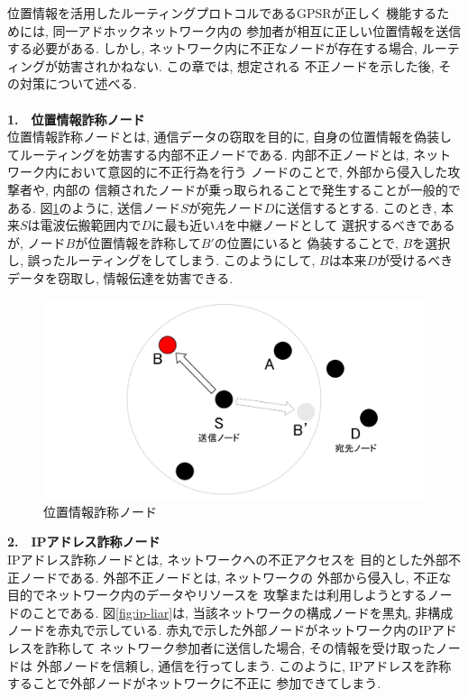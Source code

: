 位置情報を活用したルーティングプロトコルであるGPSRが正しく
機能するためには, 同一アドホックネットワーク内の
参加者が相互に正しい位置情報を送信する必要がある. 
しかし, ネットワーク内に不正なノードが存在する場合, 
ルーティングが妨害されかねない. この章では, 想定される 
不正ノードを示した後, その対策について述べる. \\

\\[0.5em]
\noindent \textbf{1.　位置情報詐称ノード}\\
\indent 位置情報詐称ノードとは, 通信データの窃取を目的に, 
自身の位置情報を偽装してルーティングを妨害する内部不正ノードである. 
内部不正ノードとは, ネットワーク内において意図的に不正行為を行う
ノードのことで, 外部から侵入した攻撃者や, 内部の
信頼されたノードが乗っ取られることで発生することが一般的である. 
図\ref{fig:position-liar}のように, 送信ノード$S$が宛先ノード$D$に送信するとする. 
このとき, 本来$S$は電波伝搬範囲内で$D$に最も近い$A$を中継ノードとして
選択するべきであるが, ノード$B$が位置情報を詐称して$B'$の位置にいると
偽装することで, $B$を選択し, 誤ったルーティングをしてしまう. 
このようにして, $B$は本来$D$が受けるべきデータを窃取し, 
情報伝達を妨害できる.

\begin{figure}
  \centering
  \includegraphics[scale=0.7]{figures/position-liar.png}
  \caption{位置情報詐称ノード}
  \label{fig:position-liar}
\end{figure}

\noindent \textbf{2.　IPアドレス詐称ノード}\\
\indent IPアドレス詐称ノードとは, ネットワークへの不正アクセスを
目的とした外部不正ノードである. 外部不正ノードとは, ネットワークの
外部から侵入し, 不正な目的でネットワーク内のデータやリソースを
攻撃または利用しようとするノードのことである. 図\ref{fig:ip-liar}は,  
当該ネットワークの構成ノードを黒丸, 非構成ノードを赤丸で示している. 
赤丸で示した外部ノードがネットワーク内のIPアドレスを詐称して
ネットワーク参加者に送信した場合, その情報を受け取ったノードは
外部ノードを信頼し, 通信を行ってしまう. このように, 
IPアドレスを詐称することで外部ノードがネットワークに不正に
参加できてしまう. 

